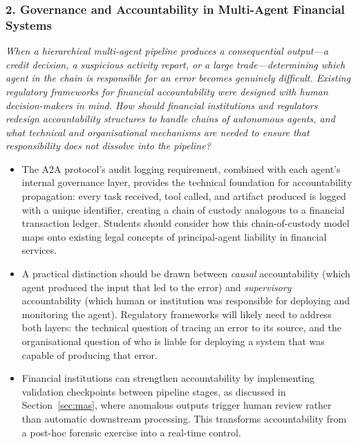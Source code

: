 \documentclass{article}
\begin{document}
\subsubsection*{2. Governance and Accountability in Multi-Agent Financial Systems}
\textit{When a hierarchical multi-agent pipeline produces a consequential output---a credit decision, a suspicious activity report, or a large trade---determining which agent in the chain is responsible for an error becomes genuinely difficult. Existing regulatory frameworks for financial accountability were designed with human decision-makers in mind. How should financial institutions and regulators redesign accountability structures to handle chains of autonomous agents, and what technical and organisational mechanisms are needed to ensure that responsibility does not dissolve into the pipeline?}
\begin{itemize}
    \item The A2A protocol's audit logging requirement, combined with each agent's internal governance layer, provides the technical foundation for accountability propagation: every task received, tool called, and artifact produced is logged with a unique identifier, creating a chain of custody analogous to a financial transaction ledger. Students should consider how this chain-of-custody model maps onto existing legal concepts of principal-agent liability in financial services.
    \item A practical distinction should be drawn between \textit{causal} accountability (which agent produced the input that led to the error) and \textit{supervisory} accountability (which human or institution was responsible for deploying and monitoring the agent). Regulatory frameworks will likely need to address both layers: the technical question of tracing an error to its source, and the organisational question of who is liable for deploying a system that was capable of producing that error.
    \item Financial institutions can strengthen accountability by implementing validation checkpoints between pipeline stages, as discussed in Section~\ref{sec:mas}, where anomalous outputs trigger human review rather than automatic downstream processing. This transforms accountability from a post-hoc forensic exercise into a real-time control.
\end{itemize}
\end{document}

